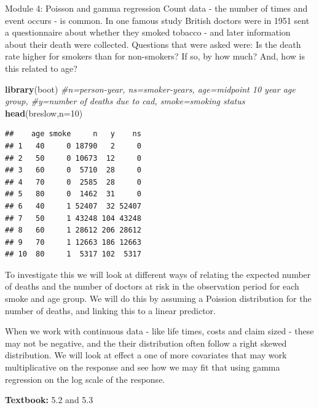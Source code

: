 \documentclass[
  ignorenonframetext,
]{beamer}
\newenvironment{Shaded}{\begin{snugshade}}{\end{snugshade}}
\newcommand{\AttributeTok}[1]{\textcolor[rgb]{0.13,0.29,0.53}{#1}}
\newcommand{\CommentTok}[1]{\textcolor[rgb]{0.56,0.35,0.01}{\textit{#1}}}
\newcommand{\DecValTok}[1]{\textcolor[rgb]{0.00,0.00,0.81}{#1}}
\newcommand{\FunctionTok}[1]{\textcolor[rgb]{0.13,0.29,0.53}{\textbf{#1}}}
\newcommand{\NormalTok}[1]{#1}
\begin{document}
\begin{frame}[fragile]
\begin{block}{Module 4: Poisson and gamma regression}
\protect\hypertarget{module-4-poisson-and-gamma-regression}{}
Count data - the number of times and event occurs - is common. In one
famous study British doctors were in 1951 sent a questionnaire about
whether they smoked tobacco - and later information about their death
were collected. Questions that were asked were: Is the death rate higher
for smokers than for non-smokers? If so, by how much? And, how is this
related to age?

\tiny

\begin{Shaded}
\begin{Highlighting}[]
\FunctionTok{library}\NormalTok{(boot) }\CommentTok{\#n=person{-}year, ns=smoker{-}years, age=midpoint 10 year age group, }
\CommentTok{\#y=number of deaths due to cad, smoke=smoking status}
\FunctionTok{head}\NormalTok{(breslow,}\AttributeTok{n=}\DecValTok{10}\NormalTok{)}
\end{Highlighting}
\end{Shaded}

\begin{verbatim}
##    age smoke     n   y    ns
## 1   40     0 18790   2     0
## 2   50     0 10673  12     0
## 3   60     0  5710  28     0
## 4   70     0  2585  28     0
## 5   80     0  1462  31     0
## 6   40     1 52407  32 52407
## 7   50     1 43248 104 43248
## 8   60     1 28612 206 28612
## 9   70     1 12663 186 12663
## 10  80     1  5317 102  5317
\end{verbatim}

\normalsize
\end{block}
\end{frame}

\begin{frame}
To investigate this we will look at different ways of relating the
expected number of deaths and the number of doctors at risk in the
observation period for each smoke and age group. We will do this by
assuming a Poission distribution for the number of deaths, and linking
this to a linear predictor.

When we work with continuous data - like life times, costs and claim
sized - these may not be negative, and the their distribution often
follow a right skewed distribution. We will look at effect a one of more
covariates that may work multiplicative on the response and see how we
may fit that using gamma regression on the log scale of the response.

\textbf{Textbook:} 5.2 and 5.3
\end{frame}
\end{document}
